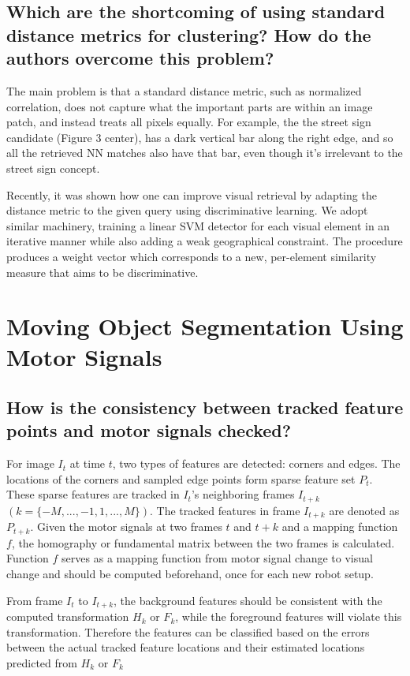\documentclass[paper=a4, fontsize=11pt]{scrartcl} %
\numberwithin{equation}{section} %
\numberwithin{figure}{section} %
\numberwithin{table}{section} %
\begin{document}
\subsection{Which are the shortcoming of using standard distance metrics for clustering? How do the authors overcome this problem?}
The main problem is that a standard distance metric, such as normalized correlation, does not capture what
the important parts are within an image patch, and instead treats all
pixels equally. For example, the the street sign candidate (Figure 3
center), has a dark vertical bar along the right edge, and so all the
retrieved NN matches also have that bar, even though it's irrelevant
to the street sign concept.

Recently, it was shown how one can improve
visual retrieval by adapting the distance metric to the given query
using discriminative learning. We adopt similar machinery, training
a linear SVM detector for each visual element in an iterative manner while also adding a weak geographical
constraint. The procedure produces a weight vector which corresponds to a new, per-element similarity measure that aims to be discriminative.

\section{Moving Object Segmentation Using Motor Signals}
\subsection{How is the consistency between tracked feature points and motor signals checked?}
For image $I_t$ at time $t$, two types of features are detected: corners and edges.
The locations of the corners and sampled edge points form sparse feature
set $P_t$. These sparse features are tracked in $I_t$'s neighboring frames $I_{t+k}$ $(k = \{−M, ..., −1, 1, ..., M\})$. The tracked features in frame $I_{t+k}$ are denoted as $P_{t+k}$.
Given the motor signals at two frames $t$ and $t + k$ and a mapping function $f$, the homography or
fundamental matrix between the two frames is calculated. Function $f$ serves as a mapping function from motor signal change to visual change and should be computed beforehand, once for each new robot setup. 

From frame $I_t$ to $I_{t+k}$, the background features should be consistent with
the computed transformation $H_k$ or $F_k$, while the foreground features will violate this transformation. Therefore the features can be classified based on the errors between the actual tracked feature locations and their estimated locations predicted from $H_k$ or $F_k$
\end{document}
